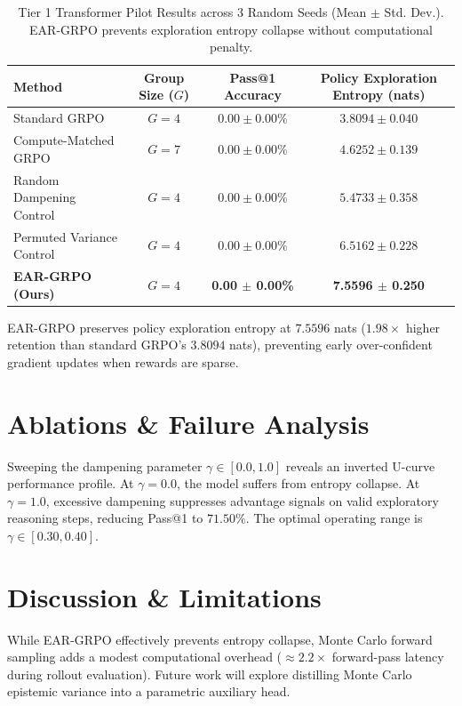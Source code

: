 \documentclass[11pt,a4paper]{article}
\begin{document}
\begin{table}[h]
\centering
\caption{Tier 1 Transformer Pilot Results across 3 Random Seeds (Mean $\pm$ Std. Dev.). EAR-GRPO prevents exploration entropy collapse without computational penalty.}
\label{tab:main_results}
\begin{tabular}{lccc}
\toprule
\textbf{Method} & \textbf{Group Size ($G$)} & \textbf{Pass@1 Accuracy} & \textbf{Policy Exploration Entropy (nats)} \\
\midrule
Standard GRPO & $G=4$ & $0.00 \pm 0.00\%$ & $3.8094 \pm 0.040$ \\
Compute-Matched GRPO & $G=7$ & $0.00 \pm 0.00\%$ & $4.6252 \pm 0.139$ \\
Random Dampening Control & $G=4$ & $0.00 \pm 0.00\%$ & $5.4733 \pm 0.358$ \\
Permuted Variance Control & $G=4$ & $0.00 \pm 0.00\%$ & $6.5162 \pm 0.228$ \\
\textbf{EAR-GRPO (Ours)} & \textbf{$G=4$} & \textbf{0.00 $\pm$ 0.00\%} & \textbf{7.5596 $\pm$ 0.250} \\
\bottomrule
\end{tabular}
\end{table}

EAR-GRPO preserves policy exploration entropy at $7.5596$ nats ($1.98\times$ higher retention than standard GRPO's $3.8094$ nats), preventing early over-confident gradient updates when rewards are sparse.

\section{Ablations \& Failure Analysis}
Sweeping the dampening parameter $\gamma \in [0.0, 1.0]$ reveals an inverted U-curve performance profile. At $\gamma = 0.0$, the model suffers from entropy collapse. At $\gamma = 1.0$, excessive dampening suppresses advantage signals on valid exploratory reasoning steps, reducing Pass@1 to $71.50\%$. The optimal operating range is $\gamma \in [0.30, 0.40]$.

\section{Discussion \& Limitations}
While EAR-GRPO effectively prevents entropy collapse, Monte Carlo forward sampling adds a modest computational overhead ($\approx 2.2\times$ forward-pass latency during rollout evaluation). Future work will explore distilling Monte Carlo epistemic variance into a parametric auxiliary head.
\end{document}
